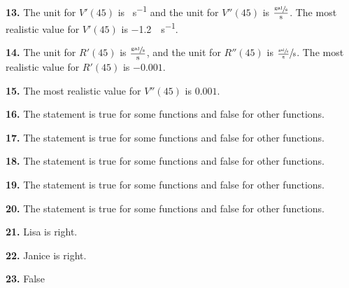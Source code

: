 \documentclass[12pt,]{book}
\theoremstyle{plain}
\theoremstyle{definition}
\numberwithin{equation}{section}
\newcommand{\fe}[2]{#1\mathopen{}\left(#2\right)\mathclose{}}
\newcommand{\fd}[1]{#1'}
\newcommand{\sd}[1]{#1''}
\begin{document}
                \par\smallskip
\noindent\textbf{13.}\quad{}
                    The unit for \(\fe{\fd{V}}{45}\) is \si{\gallon\per\second} and the unit for \(\fe{\sd{V}}{45}\) is \(\frac{\sfrac{\text{gal}}{\text{s}}}{\text{s}}\). The most realistic value for \(\fe{\fd{V}}{45}\) is \SI{-1.2}{\gallon\per\second}.%

                \par\smallskip
\noindent\textbf{14.}\quad{}
                    The unit for \(\fe{\fd{R}}{45}\) is \(\frac{\sfrac{\text{gal}}{\text{s}}}{\text{s}}\), and the unit for \(\fe{\sd{R}}{45}\) is \(\sfrac{\frac{\sfrac{\text{gal}}{\text{s}}}{\text{s}}}{\text{s}}\). The most realistic value for \(\fe{\fd{R}}{45}\) is \(-0.001\).%
 
                \par\smallskip
\noindent\textbf{15.}\quad{}
                    The most realistic value for \(\fe{\sd{V}}{45}\) is \(0.001\).%

                \par\smallskip
\noindent\textbf{16.}\quad{}
                    The statement is true for some functions and false for other functions.%

                \par\smallskip
\noindent\textbf{17.}\quad{}
                    The statement is true for some functions and false for other functions.%

                \par\smallskip
\noindent\textbf{18.}\quad{}
                    The statement is true for some functions and false for other functions.%

                \par\smallskip
\noindent\textbf{19.}\quad{}
                    The statement is true for some functions and false for other functions.%

                \par\smallskip
\noindent\textbf{20.}\quad{}
                    The statement is true for some functions and false for other functions.%

                \par\smallskip
\noindent\textbf{21.}\quad{}
                    Lisa is right.%

                \par\smallskip
\noindent\textbf{22.}\quad{}
                    Janice is right.%

                \par\smallskip
\noindent\textbf{23.}\quad{}
                    False%
 
\end{document}
